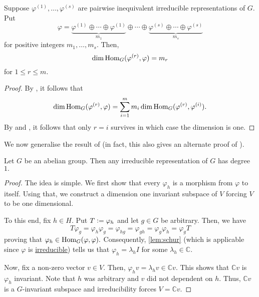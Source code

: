 \begin{cor} \label{cor:extractmultiplicitywithhom}
	Suppose $\varphi^{(1)}, \ldots, \varphi^{(s)}$ are pairwise inequivalent irreducible representations of $G.$ Put
	\begin{equation*} 
		\varphi = \underbrace{\varphi^{(1)} \oplus \cdots \oplus \varphi^{(1)}}_{m_1} \oplus \cdots \oplus \underbrace{\varphi^{(s)} \oplus \cdots \oplus \varphi^{(s)}}_{m_s}
	\end{equation*}
	for positive integers $m_1, \ldots, m_s.$ Then, 
	\begin{equation*} 
		\dim\operatorname{Hom}_{G}(\varphi^{(r)}, \varphi) = m_r
	\end{equation*}
	for $1 \le r \le m.$
\end{cor}
\begin{proof} 
	By , it follows that
	\begin{equation*} 
		\dim\operatorname{Hom}_{G}(\varphi^{(r)}, \varphi) = \sum_{i = 1}^{m}m_i\dim\operatorname{Hom}_{G}(\varphi^{(r)}, \varphi^{(i)}).
	\end{equation*}
	By  and , it follows that only $r = i$ survives in which case the dimension is one.
\end{proof}

We now generalise the result of  (in fact, this also gives an alternate proof of ).

\begin{thm} \label{thm:irredabelgroup}
	Let $G$ be an abelian group. Then any irreducible representation of $G$ has degree $1.$
\end{thm}
\begin{proof} 
	The idea is simple. We first show that every $\varphi_h$ is a morphism from $\varphi$ to itself. Using that, we construct a dimension one invariant subspace of $V$ forcing $V$ to be one dimensional.

	To this end, fix $h \in H.$ Put $T \vcentcolon= \varphi_h$ and let $g \in G$ be arbitrary. Then, we have
	\begin{equation*} 
		T\varphi_g = \varphi_h\varphi_g = \varphi_{hg} = \varphi_{gh} = \varphi_g\varphi_h = \varphi_gT
	\end{equation*}
	proving that $\varphi_h \in \operatorname{Hom}_{G}(\varphi, \varphi).$ Consequently, \autoref{lem:schur} (which is applicable since $\varphi$ is \underline{irreducible}) tells us that $\varphi_h = \lambda_h I$ for some $\lambda_h \in \mathbb{C}.$ 

	Now, fix a non-zero vector $v \in V.$ Then, $\varphi_hv = \lambda_hv \in \mathbb{C}v.$ This shows that $\mathbb{C}v$ is $\varphi_h$ invariant. Note that $h$ was arbitrary and $v$ did not dependent on $h.$ Thus, $\mathbb{C}v$ is a $G$-invariant subspace and irreducibility forces $V = \mathbb{C}v.$
\end{proof}

